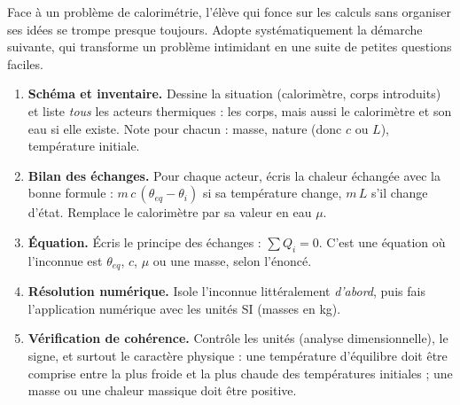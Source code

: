 \documentclass[11pt]{article}
\begin{document}
Face à un problème de calorimétrie, l'élève qui fonce sur les calculs sans organiser ses idées se trompe presque toujours. Adopte systématiquement la démarche suivante, qui transforme un problème intimidant en une suite de petites questions faciles.

\begin{methode}
\begin{enumerate}
\item \textbf{Schéma et inventaire.} Dessine la situation (calorimètre, corps introduits) et liste \emph{tous} les acteurs thermiques : les corps, mais aussi le calorimètre et son eau si elle existe. Note pour chacun : masse, nature (donc $c$ ou $L$), température initiale.
\item \textbf{Bilan des échanges.} Pour chaque acteur, écris la chaleur échangée avec la bonne formule : $m\,c\,(\theta_{eq} - \theta_i)$ si sa température change, $m\,L$ s'il change d'état. Remplace le calorimètre par sa valeur en eau $\mu$.
\item \textbf{Équation.} Écris le principe des échanges : $\sum Q_i = 0$. C'est une équation où l'inconnue est $\theta_{eq}$, $c$, $\mu$ ou une masse, selon l'énoncé.
\item \textbf{Résolution numérique.} Isole l'inconnue littéralement \emph{d'abord}, puis fais l'application numérique avec les unités SI (masses en kg).
\item \textbf{Vérification de cohérence.} Contrôle les unités (analyse dimensionnelle), le signe, et surtout le caractère physique : une température d'équilibre doit être comprise entre la plus froide et la plus chaude des températures initiales ; une masse ou une chaleur massique doit être positive.
\end{enumerate}
\end{methode}
\end{document}
